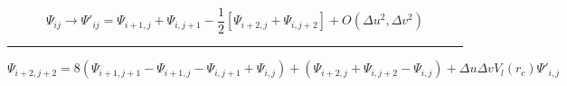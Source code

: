 \documentclass[12pt]{article}
\begin{document}
\begin{equation*}
    \Psi_{ij}\rightarrow\Psi'_{ij}=\Psi_{i+1,j}+\Psi_{i,j+1}-\frac{1}{2}\left[\Psi_{i+2,j}+\Psi_{i,j+2}\right]+O(\Delta u^2,\Delta v^2)
\end{equation*}
\noindent\rule{\textwidth}{1pt}
\begin{equation*}
    \boxed{\Psi_{i+2,j+2}=8(\Psi_{i+1,j+1}-\Psi_{i+1,j}-\Psi_{i,j+1}+\Psi_{i,j})+(\Psi_{i+2,j}+\Psi_{i,j+2}-\Psi_{i,j})+\Delta u\Delta vV_l(r_c)\Psi'_{i,j}}
\end{equation*} %
\end{document}

